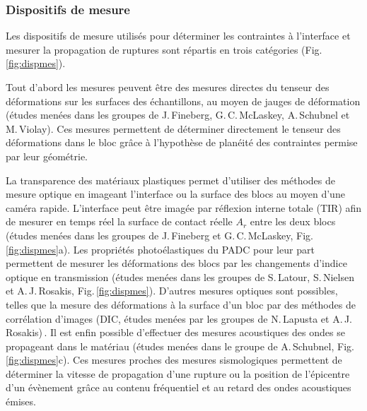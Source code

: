 \subsubsection{Dispositifs de mesure}


Les dispositifs de mesure utilisés pour déterminer les contraintes  à l'interface et mesurer la propagation de ruptures sont répartis en trois catégories (Fig.\,\ref{fig:dispmes}).

Tout d'abord les mesures peuvent être des mesures directes du tenseur des déformations sur les surfaces des échantillons, au moyen de jauges de déformation (études menées dans les groupes de J.\,Fineberg, G.\,C.\,McLaskey, A.\,Schubnel et M.\,Violay).
Ces mesures permettent de déterminer directement le tenseur des déformations dans le bloc grâce à l'hypothèse de planéité des contraintes permise par leur géométrie.

La transparence des matériaux plastiques permet d'utiliser des méthodes de mesure optique en imageant l'interface ou la surface des blocs au moyen d'une caméra rapide. L'interface peut être imagée par réflexion interne totale (TIR) afin de mesurer en temps réel la surface de contact réelle $A_r$ entre les deux blocs (études menées dans les groupes de J.\,Fineberg et G.\,C.\,McLaskey, Fig.\,\ref{fig:dispmes}a).
Les propriétés photoélastiques du PADC pour leur part permettent de mesurer les déformations des blocs par les changements d'indice optique en transmission (études menées dans les groupes de S.\,Latour, S.\,Nielsen et A.\,J.\,Rosakis, Fig.\,\ref{fig:dispmes}).
D'autres mesures optiques sont possibles, telles que la mesure des déformations à la surface d'un bloc par des méthodes de corrélation d'images (DIC, études menées par les groupes de N.\,Lapusta et A.\,J.\,Rosakis)\,\cite{rubino_understanding_2017,buijze_nucleation_2020}. Il est enfin possible d'effectuer des mesures acoustiques des ondes se propageant dans le matériau
(études menées dans le groupe de A.\,Schubnel, Fig.\,\ref{fig:dispmes}c). Ces mesures proches des mesures sismologiques permettent de déterminer la vitesse de propagation d'une rupture ou la position de l'épicentre d'un évènement grâce au contenu fréquentiel et au retard des ondes acoustiques émises.


